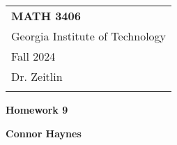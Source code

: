 \documentclass[10pt]{article}
\begin{document}

\thispagestyle{empty}

\begin{tabular}{p{15.5cm}}
  {\large \bf MATH 3406} \\ Georgia Institute of Technology \\ Fall 2024 \\ Dr. Zeitlin \\ \hline \\
\end{tabular}

\vspace{3mm}

\begin{center}
  {\Large \bf Homework 9}
  \vspace{2mm}

  {\bf Connor Haynes}
\end{center}

\vspace{4mm}
\end{document}
